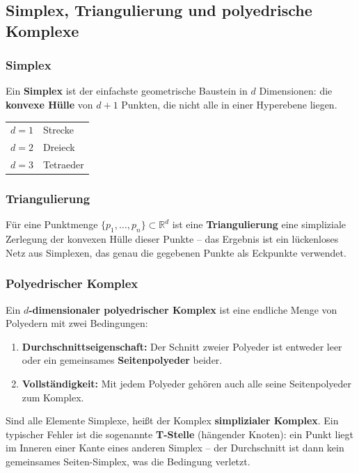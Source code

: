 \documentclass[12pt, a4paper]{article}
\begin{document}
\subsection{Simplex, Triangulierung und polyedrische Komplexe}

\subsubsection*{Simplex}

Ein \textbf{Simplex} ist der einfachste geometrische Baustein in $d$ Dimensionen: die \textbf{konvexe Hülle} von $d+1$ Punkten, die nicht alle in einer Hyperebene liegen.

\begin{center}
\begin{tabular}{ll}
  $d=1$ & Strecke \\
  $d=2$ & Dreieck \\
  $d=3$ & Tetraeder \\
\end{tabular}
\end{center}

\subsubsection*{Triangulierung}

Für eine Punktmenge $\{p_1, \dots, p_n\} \subset \mathbb{R}^d$ ist eine \textbf{Triangulierung} eine simpliziale Zerlegung der konvexen Hülle dieser Punkte -- das Ergebnis ist ein lückenloses Netz aus Simplexen, das genau die gegebenen Punkte als Eckpunkte verwendet.

\subsubsection*{Polyedrischer Komplex}

Ein \textbf{$d$-dimensionaler polyedrischer Komplex} ist eine endliche Menge von Polyedern mit zwei Bedingungen:
\begin{enumerate}
  \item \textbf{Durchschnittseigenschaft:} Der Schnitt zweier Polyeder ist entweder leer oder ein gemeinsames \textbf{Seitenpolyeder} beider.
  \item \textbf{Vollständigkeit:} Mit jedem Polyeder gehören auch alle seine Seitenpolyeder zum Komplex.
\end{enumerate}

Sind alle Elemente Simplexe, heißt der Komplex \textbf{simplizialer Komplex}. Ein typischer Fehler ist die sogenannte \textbf{T-Stelle} (hängender Knoten): ein Punkt liegt im Inneren einer Kante eines anderen Simplex -- der Durchschnitt ist dann kein gemeinsames Seiten-Simplex, was die Bedingung verletzt.
\end{document}
